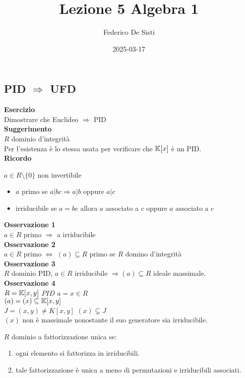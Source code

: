\documentclass[12px]{article}
\title{Lezione 5 Algebra 1}
\date{2025-03-17}
\author{Federico De Sisti}
\begin{document}
	\maketitle
	\newpage
	\subsection{PID $\Rightarrow$ UFD}
	\textbf{Esercizio}\\
	Dimostrare che Euclideo $ \Rightarrow  $ PID\\
	\textbf{Suggerimento}\\
	$R$ dominio d'integrità\\
	Per l'esistenza è lo stessa usata per verificare che $\mathbb{K}[x]$ è un PID.\\
	 \textbf{Ricordo}\\
	 \begin{defi}
		 $a\in R\setminus\{0\}$ non invertibile
		  \begin{itemize}
			  \item $a$ primo se $a | bc \Rightarrow a|b$ oppure $a|c$
			  \item irriducibile se  $a = bc$ allora $a$ associato a $c$ oppure $a$ associato a $c$
		 \end{itemize}
	 \end{defi}
	 \textbf{Osservazione 1}\\
	 $a\in R$ primo $ \Rightarrow $ a irriducibile\\
	 \textbf{Osservazione 2}\\
	 $a\in R$ primo  $ \Leftrightarrow$ $(a)\subseteq R$ primo se  $R$ domino d'integrità\\
	 \textbf{Osservazione 3}\\
	 $R$ dominio PID,  $a\in R$ irriducibile  $ \Rightarrow  (a)\subseteq R$ ideale massimale.\\
	 \textbf{Osservazione 4}\\
	 $R = \mathbb{K}[x,y]$  $PID$  $a = x\in R$\\
	 $(a) = (x)\subseteq\mathbb{K}[x,y]$ \\
	 $J = (x,y)\neq K[x,y]$  $(x)\subsetneq J$\\
	  $(x)$ non è massimale nonostante il suo generatore sia irriducibile.\\
	  \begin{defi}
	  	$R$ dominio a fattorizzazione unica se:
		\begin{enumerate}
		\item ogni elemento si fattorizza in irriducibili.
		\item tale fattorizzazione è unica a meno di permutazioni e irriducibili associati.
		\end{enumerate}
	  \end{defi}
\end{document}
